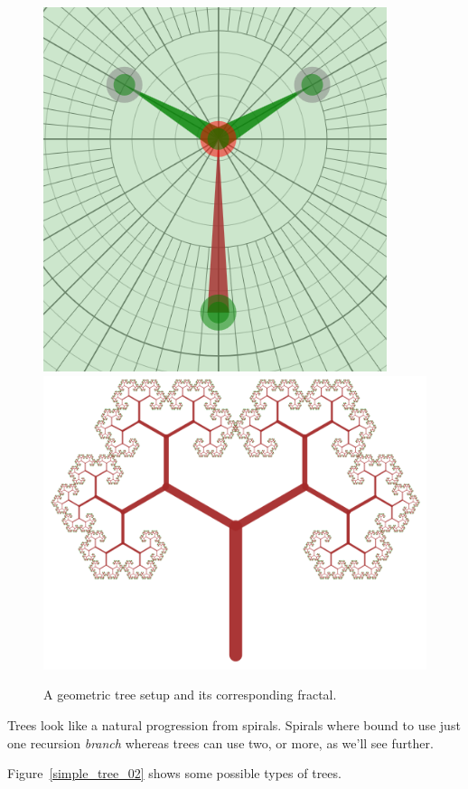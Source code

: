             \begin{figure}[ht] 
                \caption{\label{simple_tree_set_01} A geometric tree setup and its corresponding fractal.}
                \centering
                \includegraphics[height=0.3\textwidth]{img/Simple_Techniques/Trees/tree_set_01.png}
                \includegraphics[height=0.4\textwidth]{img/Simple_Techniques/Trees/tree_01.png}
                
            \end{figure}

            Trees look like a natural progression from spirals. 
            Spirals where bound to use just one recursion \emph{branch} whereas trees can use two, or more, as we'll see further.

            Figure~\ref{simple_tree_02} shows some possible types of trees. 

